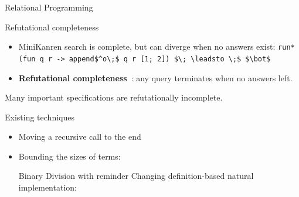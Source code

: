 \documentclass[final,20pt]{beamer}
\makeatletter
\newenvironment{CenteredBox}{%
\begin{Sbox}}{%
\end{Sbox}\centerline{\parbox{\wd\@Sbox}{\TheSbox}}}%
\makeatother
\begin{document}
\begin{frame}[t]
\begin{columns}[t]
\begin{column}{\onecolwid}
\begin{block}{Relational Programming}
      \vskip8mm
      
      
    \end{block}
    
    \begin{block}{Refutational completeness}
    \vskip7mm

      \begin{itemize}
        \item MiniKanren search is complete, but can diverge when no answers exist:
        \vskip8mm
        \lstinline|run* (fun q r -> append$^o\;$ q r [1; 2]) $\; \leadsto \;$ $\bot$|
        \vskip8mm
       \item \textbf{Refutational completeness}~\cite{byrd2009relational}: any query terminates when no answers left.
       \end{itemize}
       \vskip1cm
      
       
       \large Many important specifications are refutationally incomplete.
       \vskip1cm
       
    \end{block}
    
    \begin{block}{Existing techniques}
    \vskip7mm

	\begin{itemize}
		\item Moving a recursive call to the end
		
		\item Bounding the sizes of terms:
		
	   \vskip8mm
	   \begin{exampleblock}{\centering Binary Division with reminder}
        \justifying
        Changing definition-based natural implementation:


\end{exampleblock}
\end{itemize}
\end{block}
\end{column}
\end{columns}
\end{frame}
\end{document}

